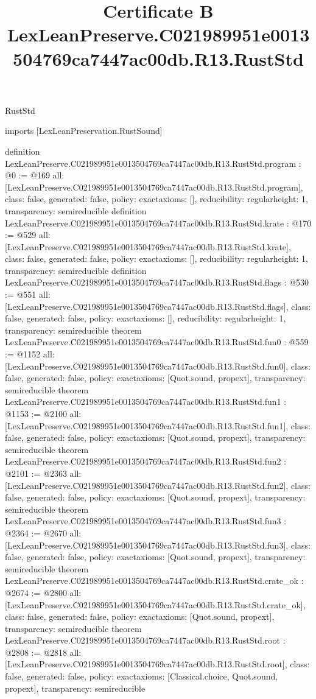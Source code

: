 \begin{lexlean}{RustStd}
\title{Certificate B LexLeanPreserve.C021989951e0013504769ca7447ac00db.R13.RustStd}
\begin{coremodule}
imports [LexLeanPreservation.RustSound]

definition LexLeanPreserve.C021989951e0013504769ca7447ac00db.R13.RustStd.program : @0 := @169 {
  all: [LexLeanPreserve.C021989951e0013504769ca7447ac00db.R13.RustStd.program],
  class: false,
  generated: false,
  policy: exact{axioms: []},
  reducibility: regular{height: 1},
  transparency: semireducible
}
definition LexLeanPreserve.C021989951e0013504769ca7447ac00db.R13.RustStd.krate : @170 := @529 {
  all: [LexLeanPreserve.C021989951e0013504769ca7447ac00db.R13.RustStd.krate],
  class: false,
  generated: false,
  policy: exact{axioms: []},
  reducibility: regular{height: 1},
  transparency: semireducible
}
definition LexLeanPreserve.C021989951e0013504769ca7447ac00db.R13.RustStd.flags : @530 := @551 {
  all: [LexLeanPreserve.C021989951e0013504769ca7447ac00db.R13.RustStd.flags],
  class: false,
  generated: false,
  policy: exact{axioms: []},
  reducibility: regular{height: 1},
  transparency: semireducible
}
theorem LexLeanPreserve.C021989951e0013504769ca7447ac00db.R13.RustStd.fun0 : @559 := @1152 {
  all: [LexLeanPreserve.C021989951e0013504769ca7447ac00db.R13.RustStd.fun0],
  class: false,
  generated: false,
  policy: exact{axioms: [Quot.sound, propext]},
  transparency: semireducible
}
theorem LexLeanPreserve.C021989951e0013504769ca7447ac00db.R13.RustStd.fun1 : @1153 := @2100 {
  all: [LexLeanPreserve.C021989951e0013504769ca7447ac00db.R13.RustStd.fun1],
  class: false,
  generated: false,
  policy: exact{axioms: [Quot.sound, propext]},
  transparency: semireducible
}
theorem LexLeanPreserve.C021989951e0013504769ca7447ac00db.R13.RustStd.fun2 : @2101 := @2363 {
  all: [LexLeanPreserve.C021989951e0013504769ca7447ac00db.R13.RustStd.fun2],
  class: false,
  generated: false,
  policy: exact{axioms: [Quot.sound, propext]},
  transparency: semireducible
}
theorem LexLeanPreserve.C021989951e0013504769ca7447ac00db.R13.RustStd.fun3 : @2364 := @2670 {
  all: [LexLeanPreserve.C021989951e0013504769ca7447ac00db.R13.RustStd.fun3],
  class: false,
  generated: false,
  policy: exact{axioms: [Quot.sound, propext]},
  transparency: semireducible
}
theorem LexLeanPreserve.C021989951e0013504769ca7447ac00db.R13.RustStd.crate_ok : @2674 := @2800 {
  all: [LexLeanPreserve.C021989951e0013504769ca7447ac00db.R13.RustStd.crate_ok],
  class: false,
  generated: false,
  policy: exact{axioms: [Quot.sound, propext]},
  transparency: semireducible
}
theorem LexLeanPreserve.C021989951e0013504769ca7447ac00db.R13.RustStd.root : @2808 := @2818 {
  all: [LexLeanPreserve.C021989951e0013504769ca7447ac00db.R13.RustStd.root],
  class: false,
  generated: false,
  policy: exact{axioms: [Classical.choice, Quot.sound, propext]},
  transparency: semireducible
}


\end{coremodule}
\end{lexlean}
